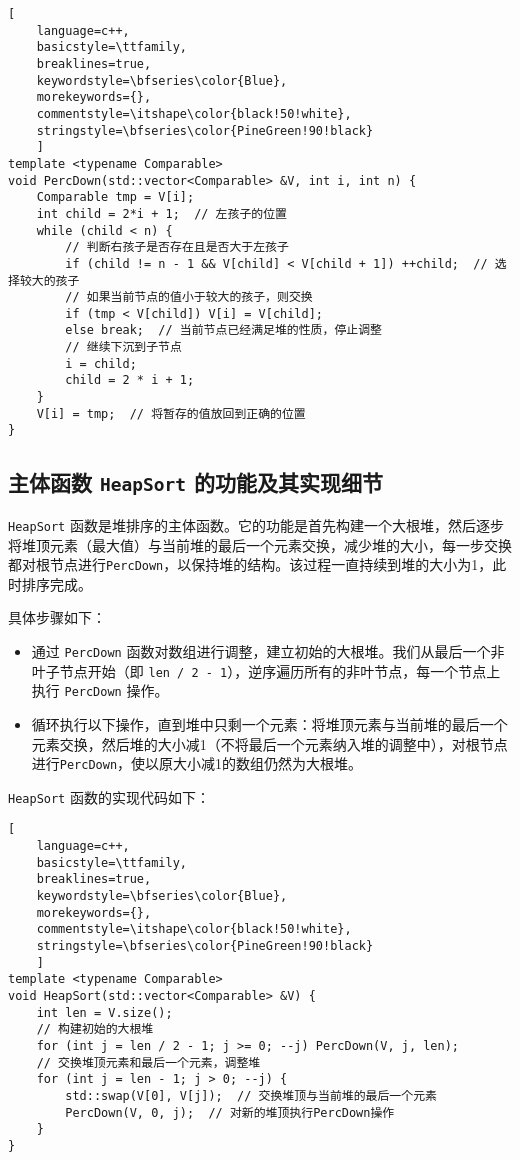 \documentclass[UTF8]{ctexart}
\begin{document}
\begin{lstlisting}[ 
    language=c++,
    basicstyle=\ttfamily,
    breaklines=true,
    keywordstyle=\bfseries\color{Blue}, 
    morekeywords={}, 
    commentstyle=\itshape\color{black!50!white},
    stringstyle=\bfseries\color{PineGreen!90!black} 
    ]
template <typename Comparable>
void PercDown(std::vector<Comparable> &V, int i, int n) {
    Comparable tmp = V[i];
    int child = 2*i + 1;  // 左孩子的位置
    while (child < n) {
        // 判断右孩子是否存在且是否大于左孩子
        if (child != n - 1 && V[child] < V[child + 1]) ++child;  // 选择较大的孩子
        // 如果当前节点的值小于较大的孩子，则交换
        if (tmp < V[child]) V[i] = V[child];
        else break;  // 当前节点已经满足堆的性质，停止调整
        // 继续下沉到子节点
        i = child;
        child = 2 * i + 1;
    }
    V[i] = tmp;  // 将暂存的值放回到正确的位置
}
\end{lstlisting}

\subsection{主体函数 \texttt{HeapSort} 的功能及其实现细节}
\texttt{HeapSort} 函数是堆排序的主体函数。它的功能是首先构建一个大根堆，然后逐步将堆顶元素（最大值）与当前堆的最后一个元素交换，减少堆的大小，每一步交换都对根节点进行\texttt{PercDown}，以保持堆的结构。该过程一直持续到堆的大小为1，此时排序完成。

具体步骤如下：

\begin{itemize}
    \item 通过 \texttt{PercDown} 函数对数组进行调整，建立初始的大根堆。我们从最后一个非叶子节点开始（即 \texttt{len / 2 - 1}），逆序遍历所有的非叶节点，每一个节点上执行 \texttt{PercDown} 操作。
    \item 循环执行以下操作，直到堆中只剩一个元素：将堆顶元素与当前堆的最后一个元素交换，然后堆的大小减1（不将最后一个元素纳入堆的调整中），对根节点进行\texttt{PercDown}，使以原大小减1的数组仍然为大根堆。
\end{itemize}

\texttt{HeapSort} 函数的实现代码如下：

\begin{lstlisting}[ 
    language=c++,
    basicstyle=\ttfamily,
    breaklines=true,
    keywordstyle=\bfseries\color{Blue}, 
    morekeywords={}, 
    commentstyle=\itshape\color{black!50!white},
    stringstyle=\bfseries\color{PineGreen!90!black} 
    ]
template <typename Comparable>
void HeapSort(std::vector<Comparable> &V) {
    int len = V.size();
    // 构建初始的大根堆
    for (int j = len / 2 - 1; j >= 0; --j) PercDown(V, j, len);
    // 交换堆顶元素和最后一个元素，调整堆
    for (int j = len - 1; j > 0; --j) {
        std::swap(V[0], V[j]);  // 交换堆顶与当前堆的最后一个元素
        PercDown(V, 0, j);  // 对新的堆顶执行PercDown操作
    }
}
\end{lstlisting}
\end{document}
